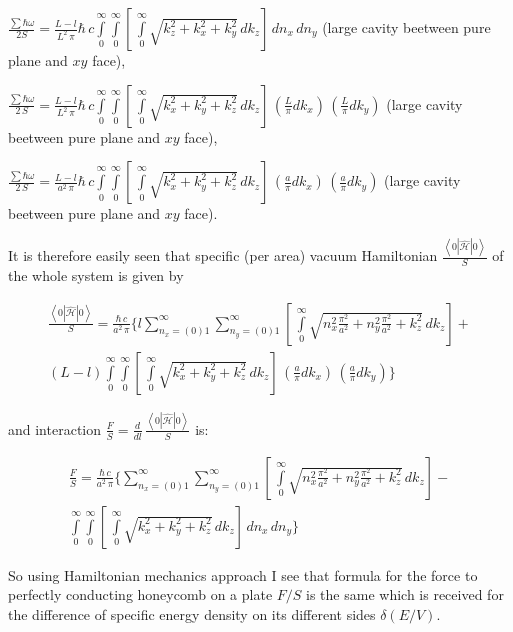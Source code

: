 \documentclass[11pt]{article}
\begin{document}
\(\frac{\sum\hbar\omega}{2 S} = \frac{L-l}{L^2\,\pi}\hbar\,c\int\limits_{0}^{\infty}\int\limits_{0}^{\infty}\left[\,\int\limits_{0}^{\infty}\sqrt{k_z^2+k_x^2+k_y^2}\,dk_z\right]\,dn_x\,dn_y\)
(large cavity beetween pure plane and \(xy\) face),

\(\frac{\sum\hbar\omega}{2\,S} = \frac{L-l}{L^2\,\pi}\hbar\,c\int\limits_{0}^{\infty}\int\limits_{0}^{\infty}\left[\,\int\limits_{0}^{\infty}\sqrt{k_x^2+k_y^2+k_z^2}\,dk_z\right]\,\left(\frac{L}{\pi}dk_x\right)\,\left(\frac{L}{\pi}dk_y\right)\)
(large cavity beetween pure plane and \(xy\) face),

\(\frac{\sum\hbar\omega}{2\,S} = \frac{L-l}{a^2\,\pi}\hbar\,c\int\limits_{0}^{\infty}\int\limits_{0}^{\infty}\left[\,\int\limits_{0}^{\infty}\sqrt{k_x^2+k_y^2+k_z^2}\,dk_z\right]\,\left(\frac{a}{\pi}dk_x\right)\,\left(\frac{a}{\pi}dk_y\right)\)
(large cavity beetween pure plane and \(xy\) face).

    It is therefore easily seen that specific (per area) vacuum Hamiltonian
\(\frac{\left<0|\hat{\mathcal{H}}|0\right>}{S}\) of the whole system is
given by

\[\begin{array}{l}
\frac{\left<0|\hat{\mathcal{H}}|0\right>}{S} = \frac{\hbar\,c}{a^2\,\pi}\Bigg\{l\sum\limits_{n_x=(0)1}^{\infty}\sum\limits_{n_y=(0)1}^{\infty}\left[\,\int\limits_{0}^{\infty}\sqrt{n_x^2\frac{\pi^2}{a^2}+n_y^2\frac{\pi^2}{a^2}+k_z^2}\,dk_z\right] + \\
(L-l)\int\limits_{0}^{\infty}\int\limits_{0}^{\infty}\left[\,\int\limits_{0}^{\infty}\sqrt{k_x^2+k_y^2+k_z^2}\,dk_z\right]\,\left(\frac{a}{\pi}dk_x\right)\,\left(\frac{a}{\pi}dk_y\right)\Bigg\}
\end{array}\]

and interaction
\(\frac{F}{S} = \frac{d}{dl} \,\frac{\left<0|\hat{\mathcal{H}}|0\right>}{S}\)
is:

\[\begin{array}{l}\frac{F}{S} = \frac{\hbar\,c}{a^2\,\pi}\Bigg\{\sum\limits_{n_x=(0)1}^{\infty}\sum\limits_{n_y=(0)1}^{\infty}\left[\,\int\limits_{0}^{\infty}\sqrt{n_x^2\frac{\pi^2}{a^2}+n_y^2\frac{\pi^2}{a^2}+k_z^2}\,dk_z\right] - \\
\int\limits_{0}^{\infty}\int\limits_{0}^{\infty}\left[\,\int\limits_{0}^{\infty}\sqrt{k_x^2+k_y^2+k_z^2}\,dk_z\right]\,dn_x\,dn_y\Bigg\}\end{array}\]

    So using Hamiltonian mechanics approach I see that formula for the force
to perfectly conducting honeycomb on a plate \({F}/{S}\) is the same
which is received for the difference of specific energy density on its
different sides \(\delta\left({E}/{V}\right)\).
\end{document}

